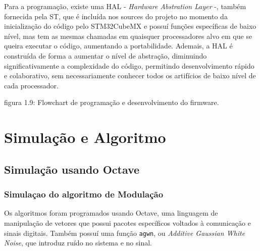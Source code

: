 \documentclass[11pt,a4paper]{report}
\begin{document}
	Para a programação, existe uma HAL - {\it Hardware Abstration Layer} -, também fornecida pela ST, que é incluída nos sources do projeto no momento da inicialização do código pelo STM32CubeMX e possuí funções específicas de baixo nível, mas tem as mesmas chamadas em quaisquer processadores alvo em que se queira executar o código, aumentando a portabilidade. Ademais, a HAL é construída de forma a aumentar o nível de abstração, diminuindo significativamente a complexidade do código, permitindo desenvolvimento rápido e colaborativo, sem necessariamente conhecer todos os artifícios de baixo nível de cada processador.
	\begin{center}
		\vspace{0.1cm}
	\footnotesize{figura 1.9: Flowchart de programação e desenvolvimento do firmware.}
	\end{center}

\chapter{Simulação e Algoritmo}
	\section{Simulação usando Octave}
		\subsection{Simulaçao do algoritmo de Modulação}
	
	Os algoritmos foram programados usando Octave, uma linguagem de manipulação de vetores que possui pacotes específicos voltados à comunicação e sinais digitais. Também possuí uma função \texttt{agwn}, ou {\it Additive Gaussian White Noise}, que introduz ruído no sistema e no sinal.\\
	
\end{document}
